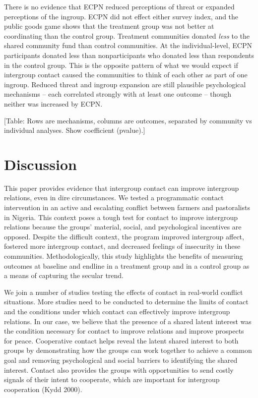 \documentclass[11pt]{article}
\begin{document}
There is no evidence that ECPN reduced perceptions of threat or expanded
perceptions of the ingroup. ECPN did not effect either survey index, and
the public goods game shows that the treatment group was not better at
coordinating than the control group. Treatment communities donated
\emph{less} to the shared community fund than control communities. At
the individual-level, ECPN participants donated less than
nonparticipants who donated less than respondents in the control group.
This is the opposite pattern of what we would expect if intergroup
contact caused the communities to think of each other as part of one
ingroup. Reduced threat and ingroup expansion are still plausible
psychological mechanisms -- each correlated strongly with at least one
outcome -- though neither was increased by ECPN.

{[}Table: Rows are mechanisms, columns are outcomes, separated by
community vs individual analyses. Show coefficient (pvalue).{]}

\hypertarget{discussion}{%
\section{Discussion}\label{discussion}}

This paper provides evidence that intergroup contact can improve
intergroup relations, even in dire circumstances. We tested a
programmatic contact intervention in an active and escalating conflict
between farmers and pastoralists in Nigeria. This context poses a tough
test for contact to improve intergroup relations because the groups'
material, social, and psychological incentives are opposed. Despite the
difficult context, the program improved intergroup affect, fostered more
intergroup contact, and decreased feelings of insecurity in these
communities. Methodologically, this study highlights the benefits of
measuring outcomes at baseline and endline in a treatment group and in a
control group as a means of capturing the secular trend.

We join a number of studies testing the effects of contact in real-world
conflict situations. More studies need to be conducted to determine the
limits of contact and the conditions under which contact can effectively
improve intergroup relations. In our case, we believe that the presence
of a shared latent interest was the condition necessary for contact to
improve relations and improve prospects for peace. Cooperative contact
helps reveal the latent shared interest to both groups by demonstrating
how the groups can work together to achieve a common goal and removing
psychological and social barriers to identifying the shared interest.
Contact also provides the groups with opportunities to send costly
signals of their intent to cooperate, which are important for intergroup
cooperation (Kydd 2000).
\end{document}
